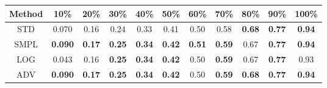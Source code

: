 \documentclass{standalone}
\begin{document}
\begin{tabular}{c|cccccccccc}
      \toprule
      Method & 10\% & 20\% & 30\% & 40\% & 50\% & 60\% & 70\% & 80\% & 90\% & 100\% \\
      \midrule
STD & 0.070 & 0.16 & 0.24 & 0.33 & 0.41 & 0.50 & 0.58 & \textbf{0.68} & \textbf{0.77} & \textbf{0.94}\\
SMPL & \textbf{0.090} & \textbf{0.17} & \textbf{0.25} & \textbf{0.34} & \textbf{0.42} & \textbf{0.51} & \textbf{0.59} & 0.67 & \textbf{0.77} & \textbf{0.94}\\
LOG & 0.043 & 0.16 & \textbf{0.25} & \textbf{0.34} & \textbf{0.42} & 0.50 & \textbf{0.59} & 0.67 & \textbf{0.77} & 0.93\\
ADV & \textbf{0.090} & \textbf{0.17} & \textbf{0.25} & \textbf{0.34} & \textbf{0.42} & 0.50 & \textbf{0.59} & \textbf{0.68} & \textbf{0.77} & \textbf{0.94}\\
  \bottomrule
\end{tabular}
\end{document}
